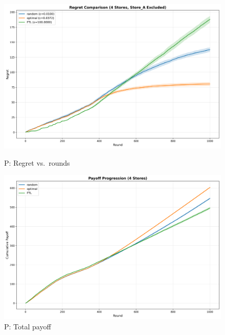 \documentclass[10pt]{article}
\begin{document}
\begin{figure}[h!]
\centering
\begin{minipage}[t]{0.48\textwidth}
    \centering
    \includegraphics[width=\linewidth]{332Project2/figures/PP_regret.png}
    \caption*{\footnotesize P: Regret vs.\ rounds}
\end{minipage}\hfill
\begin{minipage}[t]{0.48\textwidth}
    \centering
    \includegraphics[width=\linewidth]{332Project2/figures/PP_payoff.png}
    \caption*{\footnotesize P: Total payoff}
\end{minipage}
\end{figure}
\end{document}
